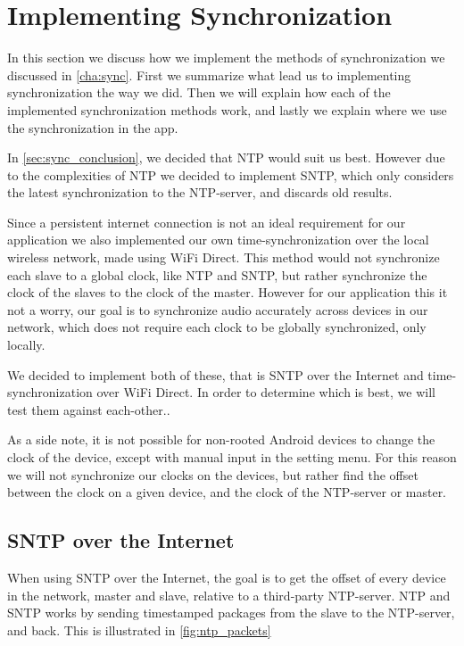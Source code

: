 \section{Implementing Synchronization}\label{sec:impl_sync}
In this section we discuss how we implement the methods of synchronization we discussed in \cref{cha:sync}.
First we summarize what lead us to implementing synchronization the way we did.
Then we will explain how each of the implemented synchronization methods work, and lastly we explain where we use the synchronization in the app.

In \cref{sec:sync_conclusion}, we decided that \ac{NTP} would suit us best.
However due to the complexities of \ac{NTP} we decided to implement \ac{SNTP}, which only considers the latest synchronization to the \ac{NTP}-server, and discards old results.

Since a persistent internet connection is not an ideal requirement for our application we also implemented our own time-synchronization over the local wireless network, made using WiFi Direct.
This method would not synchronize each slave to a global clock, like \ac{NTP} and \ac{SNTP}, but rather synchronize the clock of the slaves to the clock of the master.
However for our application this it not a worry, our goal is to synchronize audio accurately across devices in our network, which does not require each clock to be globally synchronized, only locally.

We decided to implement both of these, that is \ac{SNTP} over the Internet and time-synchronization over WiFi Direct.
In order to determine which is best, we will test them against each-other..

As a side note, it is not possible for non-rooted Android devices to change the clock of the device, except with manual input in the setting menu.
For this reason we will not synchronize our clocks on the devices, but rather find the offset between the clock on a given device, and the clock of the \ac{NTP}-server or master.

\subsection{\ac{SNTP} over the Internet}
When using \ac{SNTP} over the Internet, the goal is to get the offset of every device in the network, master and slave, relative to a third-party \ac{NTP}-server.
\ac{NTP} and \ac{SNTP} works by sending timestamped packages from the slave to the \ac{NTP}-server, and back.
This is illustrated in \cref{fig:ntp_packets}


